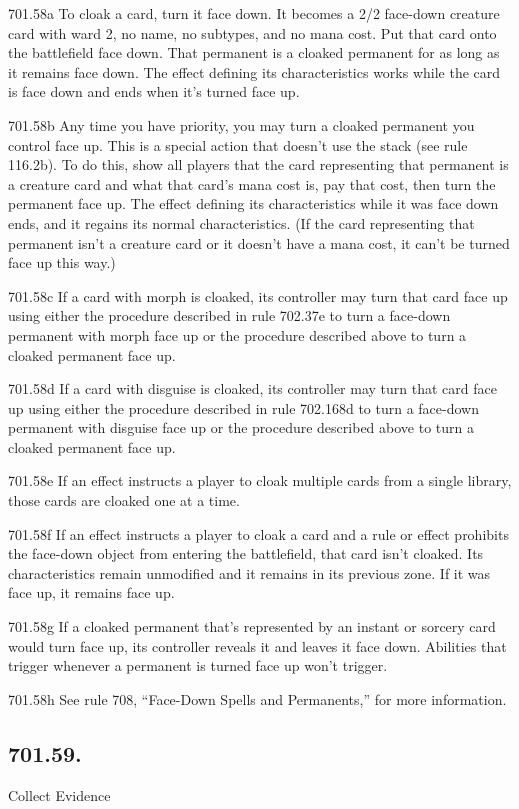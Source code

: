 701.58a To cloak a card, turn it face down. It becomes a 2/2 face-down creature card with ward {2}, no name, no subtypes, and no mana cost. Put that card onto the battlefield face down. That permanent is a cloaked permanent for as long as it remains face down. The effect defining its characteristics works while the card is face down and ends when it’s turned face up.

701.58b Any time you have priority, you may turn a cloaked permanent you control face up. This is a special action that doesn’t use the stack (see rule 116.2b). To do this, show all players that the card representing that permanent is a creature card and what that card’s mana cost is, pay that cost, then turn the permanent face up. The effect defining its characteristics while it was face down ends, and it regains its normal characteristics. (If the card representing that permanent isn’t a creature card or it doesn’t have a mana cost, it can’t be turned face up this way.)

701.58c If a card with morph is cloaked, its controller may turn that card face up using either the procedure described in rule 702.37e to turn a face-down permanent with morph face up or the procedure described above to turn a cloaked permanent face up.

701.58d If a card with disguise is cloaked, its controller may turn that card face up using either the procedure described in rule 702.168d to turn a face-down permanent with disguise face up or the procedure described above to turn a cloaked permanent face up.

701.58e If an effect instructs a player to cloak multiple cards from a single library, those cards are cloaked one at a time.

701.58f If an effect instructs a player to cloak a card and a rule or effect prohibits the face-down object from entering the battlefield, that card isn’t cloaked. Its characteristics remain unmodified and it remains in its previous zone. If it was face up, it remains face up.

701.58g If a cloaked permanent that’s represented by an instant or sorcery card would turn face up, its controller reveals it and leaves it face down. Abilities that trigger whenever a permanent is turned face up won’t trigger.

701.58h See rule 708, “Face-Down Spells and Permanents,” for more information.

\subsection*{701.59.}
Collect Evidence

